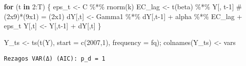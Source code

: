 \documentclass[
  spanish,
  letterpaper,
  DIV=11,
  numbers=noendperiod]{scrartcl}
\newenvironment{Shaded}{\begin{snugshade}}{\end{snugshade}}
\newcommand{\AttributeTok}[1]{\textcolor[rgb]{0.40,0.45,0.13}{#1}}
\newcommand{\CommentTok}[1]{\textcolor[rgb]{0.37,0.37,0.37}{#1}}
\newcommand{\ControlFlowTok}[1]{\textcolor[rgb]{0.00,0.23,0.31}{\textbf{#1}}}
\newcommand{\DecValTok}[1]{\textcolor[rgb]{0.68,0.00,0.00}{#1}}
\newcommand{\FunctionTok}[1]{\textcolor[rgb]{0.28,0.35,0.67}{#1}}
\newcommand{\NormalTok}[1]{\textcolor[rgb]{0.00,0.23,0.31}{#1}}
\newcommand{\OtherTok}[1]{\textcolor[rgb]{0.00,0.23,0.31}{#1}}
\newcommand{\SpecialCharTok}[1]{\textcolor[rgb]{0.37,0.37,0.37}{#1}}
\newcommand{\StringTok}[1]{\textcolor[rgb]{0.13,0.47,0.30}{#1}}
\begin{document}
\begin{Shaded}
\begin{Highlighting}[]
\ControlFlowTok{for}\NormalTok{ (t }\ControlFlowTok{in} \DecValTok{2}\SpecialCharTok{:}\NormalTok{T) \{}
\NormalTok{  eps\_t  }\OtherTok{\textless{}{-}}\NormalTok{ C }\SpecialCharTok{\%*\%} \FunctionTok{rnorm}\NormalTok{(k)}
\NormalTok{  EC\_lag }\OtherTok{\textless{}{-}} \FunctionTok{t}\NormalTok{(beta) }\SpecialCharTok{\%*\%}\NormalTok{ Y[, t}\DecValTok{{-}1}\NormalTok{]           }\CommentTok{\# (2x9)*(9x1) = (2x1)}
\NormalTok{  dY[,t] }\OtherTok{\textless{}{-}}\NormalTok{ Gamma1 }\SpecialCharTok{\%*\%}\NormalTok{ dY[,t}\DecValTok{{-}1}\NormalTok{] }\SpecialCharTok{+}\NormalTok{ alpha }\SpecialCharTok{\%*\%}\NormalTok{ EC\_lag }\SpecialCharTok{+}\NormalTok{ eps\_t}
\NormalTok{  Y[,t]  }\OtherTok{\textless{}{-}}\NormalTok{ Y[,t}\DecValTok{{-}1}\NormalTok{] }\SpecialCharTok{+}\NormalTok{ dY[,t]}
\NormalTok{\}}

\NormalTok{Y\_ts }\OtherTok{\textless{}{-}} \FunctionTok{ts}\NormalTok{(}\FunctionTok{t}\NormalTok{(Y), }\AttributeTok{start =} \FunctionTok{c}\NormalTok{(}\DecValTok{2007}\NormalTok{,}\DecValTok{1}\NormalTok{), }\AttributeTok{frequency =}\NormalTok{ fq); }\FunctionTok{colnames}\NormalTok{(Y\_ts) }\OtherTok{\textless{}{-}}\NormalTok{ vars}
\end{Highlighting}
\end{Shaded}

\begin{Shaded}
\end{Shaded}

\begin{verbatim}
Rezagos VAR(Δ) (AIC): p_d = 1 
\end{verbatim}
\end{document}
